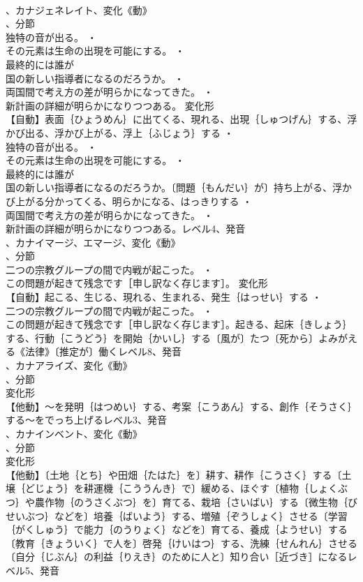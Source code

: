 \documentclass[8pt]{extreport}
\begin{document}
\begin{CJK}{UTF8}{min}
\\	、カナジェネレイト、変化《動》
\\	、分節
\\	独特の音が出る。 ・
\\	その元素は生命の出現を可能にする。 ・
\\	最終的には誰が
\\	国の新しい指導者になるのだろうか。 ・
\\	両国間で考え方の差が明らかになってきた。 ・
\\	新計画の詳細が明らかになりつつある。	変化形 
\\	【自動】表面｛ひょうめん｝に出てくる、現れる、出現｛しゅつげん｝する、浮かび出る、浮かび上がる、浮上｛ふじょう｝する ・
\\	独特の音が出る。 ・
\\	その元素は生命の出現を可能にする。 ・
\\	最終的には誰が
\\	国の新しい指導者になるのだろうか。〔問題｛もんだい｝が〕持ち上がる、浮かび上がる分かってくる、明らかになる、はっきりする ・
\\	両国間で考え方の差が明らかになってきた。 ・
\\	新計画の詳細が明らかになりつつある。レベル4、発音
\\	、カナイマージ、エマージ、変化《動》
\\	、分節
\\	二つの宗教グループの間で内戦が起こった。 ・
\\	この問題が起きて残念です［申し訳なく存じます］。	変化形 
\\	【自動】起こる、生じる、現れる、生まれる、発生｛はっせい｝する ・
\\	二つの宗教グループの間で内戦が起こった。 ・
\\	この問題が起きて残念です［申し訳なく存じます］。起きる、起床｛きしょう｝する、行動｛こうどう｝を開始｛かいし｝する〔風が〕たつ〔死から〕よみがえる《法律》〔推定が〕働くレベル8、発音
\\	、カナアライズ、変化《動》
\\	、分節
\\	変化形 
\\	【他動】～を発明｛はつめい｝する、考案｛こうあん｝する、創作｛そうさく｝する～をでっち上げるレベル3、発音
\\	、カナインベント、変化《動》
\\	、分節
\\	変化形 
\\	【他動】〔土地｛とち｝や田畑｛たはた｝を〕耕す、耕作｛こうさく｝する〔土壌｛どじょう｝を耕運機｛こううんき｝で〕緩める、ほぐす〔植物｛しょくぶつ｝や農作物｛のうさくぶつ｝を〕育てる、栽培｛さいばい｝する〔微生物｛びせいぶつ｝などを〕培養｛ばいよう｝する、増殖｛ぞうしょく｝させる〔学習｛がくしゅう｝で能力｛のうりょく｝などを〕育てる、養成｛ようせい｝する〔教育｛きょういく｝で人を〕啓発｛けいはつ｝する、洗練｛せんれん｝させる〔自分｛じぶん｝の利益｛りえき｝のために人と〕知り合い［近づき］になるレベル5、発音

\end{CJK}
\end{document}
